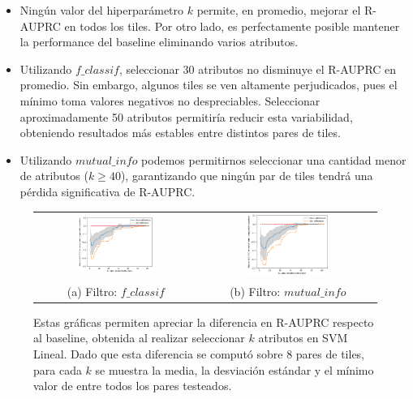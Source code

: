 \begin{itemize}
\item Ningún valor del hiperparámetro $k$ permite, en promedio, mejorar el R-AUPRC en todos los tiles. Por otro lado, es perfectamente posible mantener la performance del baseline eliminando varios atributos.
\item Utilizando $f\_classif$, seleccionar 30 atributos no disminuye el R-AUPRC en promedio. Sin embargo, algunos tiles se ven altamente perjudicados, pues el mínimo toma valores negativos no despreciables. Seleccionar aproximadamente 50 atributos permitiría reducir esta variabilidad, obteniendo resultados más estables entre distintos pares de tiles.
\item Utilizando $mutual\_info$ podemos permitirnos seleccionar una cantidad menor de atributos ($k \geq 40$), garantizando que ningún par de tiles tendrá una pérdida significativa de R-AUPRC.
\end{itemize} 

\begin{figure}[h!]
\begin{tabular}{cc}
  \includegraphics[width=0.49\textwidth]{Kap5/linearBEST_K_f_classif.png} &   \includegraphics[width=0.49\textwidth]{Kap5/linearBEST_K_mutual_info_classif.png} \\
(a) Filtro: $f\_classif$ & (b) Filtro: $mutual\_info$
\end{tabular}
\caption{Estas gráficas permiten apreciar la diferencia en R-AUPRC respecto al baseline, obtenida al realizar seleccionar $k$ atributos en SVM Lineal. Dado que esta diferencia se computó sobre 8 pares de tiles, para cada $k$ se muestra la media, la desviación estándar y el mínimo valor de entre todos los pares testeados. }
\label{fig:optimal_k_svml}
\end{figure}


